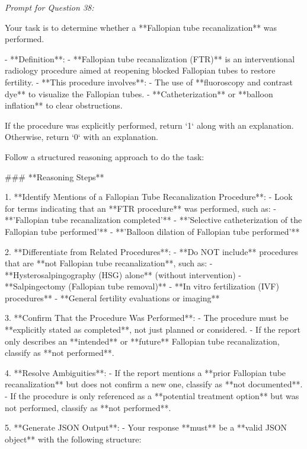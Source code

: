 \textit{\normalsize Prompt for Question  38:}
\begin{mdframed}[]
\normalsize

Your task is to determine whether a **Fallopian tube recanalization** was performed.  

- **Definition**:  
  - **Fallopian tube recanalization (FTR)** is an interventional radiology procedure aimed at reopening blocked Fallopian tubes to restore fertility.  
  - **This procedure involves**:  
    - The use of **fluoroscopy and contrast dye** to visualize the Fallopian tubes.  
    - **Catheterization** or **balloon inflation** to clear obstructions.  

If the procedure was explicitly performed, return `1` along with an explanation. Otherwise, return `0` with an explanation.

Follow a structured reasoning approach to do the task:

### **Reasoning Steps**  

1. **Identify Mentions of a Fallopian Tube Recanalization Procedure**:  
   - Look for terms indicating that an **FTR procedure** was performed, such as:  
     - **'Fallopian tube recanalization completed'**  
     - **'Selective catheterization of the Fallopian tube performed'**  
     - **'Balloon dilation of Fallopian tube performed'**  

2. **Differentiate from Related Procedures**:  
   - **Do NOT include** procedures that are **not Fallopian tube recanalization**, such as:  
     - **Hysterosalpingography (HSG) alone** (without intervention)  
     - **Salpingectomy (Fallopian tube removal)**  
     - **In vitro fertilization (IVF) procedures**  
     - **General fertility evaluations or imaging**  

3. **Confirm That the Procedure Was Performed**:  
   - The procedure must be **explicitly stated as completed**, not just planned or considered.  
   - If the report only describes an **intended** or **future** Fallopian tube recanalization, classify as **not performed**.  

4. **Resolve Ambiguities**:  
   - If the report mentions a **prior Fallopian tube recanalization** but does not confirm a new one, classify as **not documented**.  
   - If the procedure is only referenced as a **potential treatment option** but was not performed, classify as **not performed**.  

5. **Generate JSON Output**:  
   - Your response **must** be a **valid JSON object** with the following structure:  

\end{mdframed}


